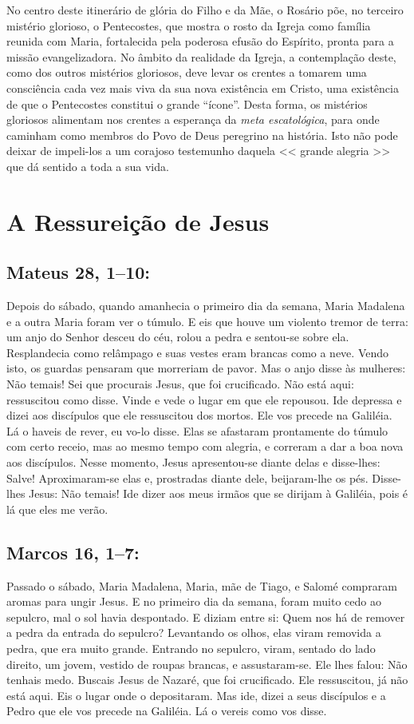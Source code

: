 \documentclass[10pt,a5paper]{book}
\newcommand{\from}[1]{\subsection*{#1}}
\begin{document}
No centro deste itinerário de glória do Filho e da Mãe, o Rosário põe, no terceiro mistério glorioso, o Pentecostes, que mostra o rosto da Igreja como família reunida com Maria, fortalecida pela poderosa efusão do Espírito, pronta para a missão evangelizadora.
No âmbito da realidade da Igreja, a contemplação deste, como dos outros mistérios gloriosos, deve levar os crentes a tomarem uma consciência cada vez mais viva da sua nova existência em Cristo, uma existência de que o Pentecostes constitui o grande ``ícone''.
Desta forma, os mistérios gloriosos alimentam nos crentes a esperança da \emph{meta escatológica}, para onde caminham como membros do Povo de Deus peregrino na história.
Isto não pode deixar de impeli-los a um corajoso testemunho daquela << grande alegria >> que dá sentido a toda a sua vida.


\section{A Ressureição de Jesus}

\from{Mateus 28, 1--10:}

Depois do sábado, quando amanhecia o primeiro dia da semana, Maria Madalena e a outra Maria foram ver o túmulo.
E eis que houve um violento tremor de terra: um anjo do Senhor desceu do céu, rolou a pedra e sentou-se sobre ela.
Resplandecia como relâmpago e suas vestes eram brancas como a neve.
Vendo isto, os guardas pensaram que morreriam de pavor.
Mas o anjo disse às mulheres: Não temais! Sei que procurais Jesus, que foi crucificado.
Não está aqui: ressuscitou como disse. Vinde e vede o lugar em que ele repousou.
Ide depressa e dizei aos discípulos que ele ressuscitou dos mortos. Ele vos precede na Galiléia. Lá o haveis de rever, eu vo-lo disse.
Elas se afastaram prontamente do túmulo com certo receio, mas ao mesmo tempo com alegria, e correram a dar a boa nova aos discípulos.
Nesse momento, Jesus apresentou-se diante delas e disse-lhes: Salve! Aproximaram-se elas e, prostradas diante dele, beijaram-lhe os pés.
Disse-lhes Jesus: Não temais! Ide dizer aos meus irmãos que se dirijam à Galiléia, pois é lá que eles me verão.

\from{Marcos 16, 1--7:}

Passado o sábado, Maria Madalena, Maria, mãe de Tiago, e Salomé compraram aromas para ungir Jesus.
E no primeiro dia da semana, foram muito cedo ao sepulcro, mal o sol havia despontado.
E diziam entre si: Quem nos há de remover a pedra da entrada do sepulcro?
Levantando os olhos, elas viram removida a pedra, que era muito grande.
Entrando no sepulcro, viram, sentado do lado direito, um jovem, vestido de roupas brancas, e assustaram-se.
Ele lhes falou: Não tenhais medo. Buscais Jesus de Nazaré, que foi crucificado. Ele ressuscitou, já não está aqui. Eis o lugar onde o depositaram.
Mas ide, dizei a seus discípulos e a Pedro que ele vos precede na Galiléia. Lá o vereis como vos disse.
\end{document}
